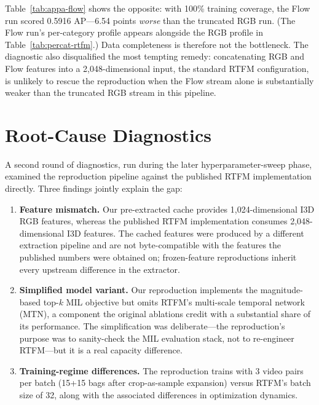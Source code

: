 Table~\ref{tab:appa-flow} shows the opposite: with 100\% training coverage,
the Flow run scored 0.5916 AP---6.54 points \emph{worse} than the truncated
RGB run. (The Flow run's per-category profile appears alongside the RGB
profile in Table~\ref{tab:percat-rtfm}.) Data completeness is therefore not
the bottleneck. The diagnostic also disqualified the most tempting remedy:
concatenating RGB and Flow features into a 2{,}048-dimensional input, the
standard RTFM configuration, is unlikely to rescue the reproduction when the
Flow stream alone is substantially weaker than the truncated RGB stream in
this pipeline.

\section{Root-Cause Diagnostics}
\label{sec:appa-rootcause}

A second round of diagnostics, run during the later hyperparameter-sweep
phase, examined the reproduction pipeline against the published RTFM
implementation directly. Three findings jointly explain the gap:

\begin{enumerate}
    \item \textbf{Feature mismatch.} Our pre-extracted cache provides
    1{,}024-dimensional I3D RGB features, whereas the published RTFM
    implementation consumes 2{,}048-dimensional I3D features. The cached
    features were produced by a different extraction pipeline and are not
    byte-compatible with the features the published numbers were obtained
    on; frozen-feature reproductions inherit every upstream difference in
    the extractor.
    \item \textbf{Simplified model variant.} Our reproduction implements the
    magnitude-based top-$k$ MIL objective but omits RTFM's multi-scale
    temporal network (MTN), a component the original ablations credit with
    a substantial share of its performance. The simplification was
    deliberate---the reproduction's purpose was to sanity-check the MIL
    evaluation stack, not to re-engineer RTFM---but it is a real capacity
    difference.
    \item \textbf{Training-regime differences.} The reproduction trains
    with 3 video pairs per batch (15+15 bags after crop-as-sample
    expansion) versus RTFM's batch size of 32, along with the associated
    differences in optimization dynamics.
\end{enumerate}


